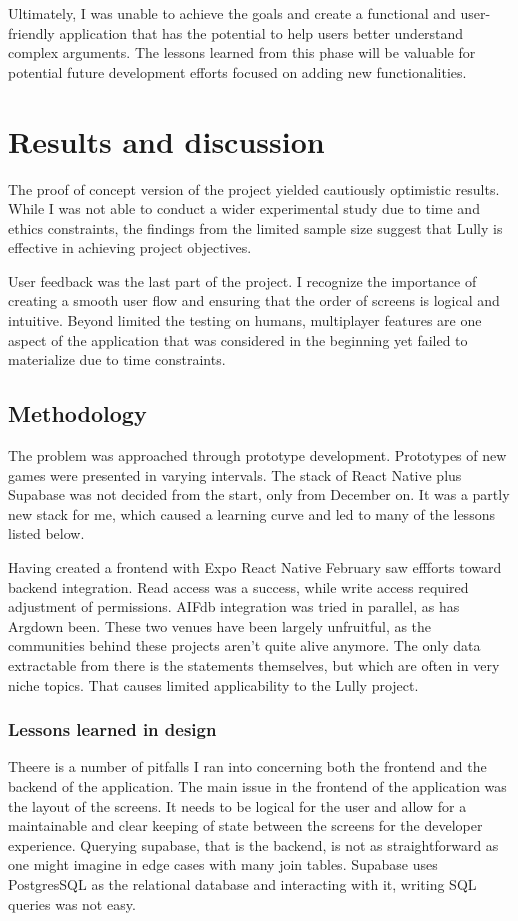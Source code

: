 \documentclass{report}
\begin{document}
Ultimately, I was unable to achieve the goals and create a functional and user-friendly application that has the potential to help users better understand complex arguments. The lessons learned from this phase will be valuable for potential future development efforts focused on adding new functionalities.

\newpage

\chapter{Results and discussion}

The proof of concept version of the  project yielded cautiously optimistic results. While I was not able to conduct a wider experimental study due to time and ethics constraints, the findings from the limited sample size suggest that Lully is effective in achieving project objectives. 

User feedback was the last part of the project. I recognize the importance of creating a smooth user flow and ensuring that the order of screens is logical and intuitive. Beyond limited the testing on humans, multiplayer features are one aspect of the application that was considered in the beginning yet failed to materialize due to time constraints. 

\section{Methodology}
The problem was approached through prototype development. Prototypes of new games were presented in varying intervals. The stack of React Native plus Supabase was not decided from the start, only from December on. It was a partly new stack for me, which caused a learning curve and led to many of the lessons listed below.

Having created a frontend with Expo React Native February saw effforts toward backend integration. Read access was a success, while write access required adjustment of permissions. AIFdb integration was tried in parallel, as has Argdown been. These two venues have been largely unfruitful, as the communities behind these projects aren't quite alive anymore. The only data extractable from there is the statements themselves, but which are often in very niche topics. That causes limited applicability to the Lully project. 

\subsection{Lessons learned in design}
Theere is a number of pitfalls I ran into concerning both the frontend and the backend of the application. The main issue in the frontend of the application was the layout of the screens. It needs to be logical for the user and allow for a maintainable and clear keeping of state between the screens for the developer experience. Querying supabase, that is the backend, is not as straightforward as one might imagine in edge cases with many join tables. Supabase uses PostgresSQL as the relational database and interacting with it, writing SQL queries was not easy. 
\end{document}
